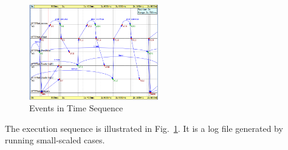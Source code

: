 \begin{figure}[h!]
  \centering
    \includegraphics[width=0.5\textwidth]{figures/r_seq.png}
  \caption{Events in Time Sequence}
  \label{fig:r_seq}
  \vspace{-0.2in}
\end{figure}

The execution sequence is illustrated in Fig.~\ref{fig:r_seq}. It is a log file
generated by running small-scaled cases.



